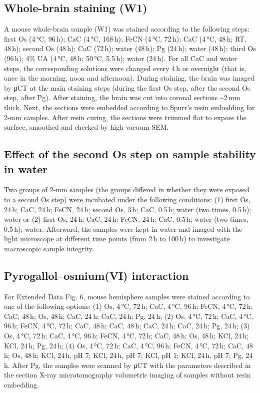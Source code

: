 \documentclass{article}
\begin{document}
\subsection*{Whole-brain staining (W1)}
A mouse whole-brain sample (W1) was stained according to the following steps: first Os (4\,°C, 96\,h); CaC (4\,°C, 168\,h); FeCN (4\,°C, 72\,h); CaC (4\,°C, 48\,h; RT, 48\,h); second Os (48\,h); CaC (72\,h); water (48\,h); Pg (24\,h); water (48\,h); third Os (96\,h); 4\% UA (4\,°C, 48\,h; 50\,°C, 5.5\,h); water (24\,h). For all CaC and water steps, the corresponding solutions were changed every 4\,h or overnight (that is, once in the morning, noon and afternoon). During staining, the brain was imaged by μCT at the main staining steps (during the first Os step, after the second Os step, after Pg). After staining, the brain was cut into coronal sections \textasciitilde{}2\,mm thick. Next, the sections were embedded according to Spurr’s resin embedding for 2-mm samples. After resin curing, the sections were trimmed flat to expose the surface, smoothed and checked by high-vacuum SEM.

\subsection*{Effect of the second Os step on sample stability in water}
Two groups of 2-mm samples (the groups differed in whether they were exposed to a second Os step) were incubated under the following conditions: (1) first Os, 24\,h; CaC, 24\,h; FeCN, 24\,h; second Os, 3\,h; CaC, 0.5\,h; water (two times, 0.5\,h); water or (2) first Os, 24\,h; CaC, 24\,h; FeCN, 24\,h; CaC, 0.5\,h; water (two times, 0.5\,h); water. Afterward, the samples were kept in water and imaged with the light microscope at different time points (from 2\,h to 100\,h) to investigate macroscopic sample integrity.

\subsection*{Pyrogallol–osmium(VI) interaction}
For Extended Data Fig. 6, mouse hemisphere samples were stained according to one of the following options: (1) Os, 4\,°C, 72\,h; CaC, 4\,°C, 96\,h; FeCN, 4\,°C, 72\,h; CaC, 48\,h; Os, 48\,h; CaC, 24\,h; CaC, 24\,h; Pg, 24\,h; (2) Os, 4\,°C, 72\,h; CaC, 4\,°C, 96\,h; FeCN, 4\,°C, 72\,h; CaC, 48\,h; CaC, 48\,h; CaC, 24\,h; CaC, 24\,h; Pg, 24\,h; (3) Os, 4\,°C, 72\,h; CaC, 4\,°C, 96\,h; FeCN, 4\,°C, 72\,h; CaC, 48\,h; Os, 48\,h; KCl, 24\,h; KCl, 24\,h; Pg, 24\,h; (4) Os, 4\,°C, 72\,h; CaC, 4\,°C, 96\,h; FeCN, 4\,°C, 72\,h; CaC, 48\,h; Os, 48\,h; KCl, 24\,h, pH 7; KCl, 24\,h, pH 7; KCl, pH 1; KCl, 24\,h, pH 7; Pg, 24\,h. After Pg, the samples were scanned by μCT with the parameters described in the section X-ray microtomography volumetric imaging of samples without resin embedding.
\end{document}
